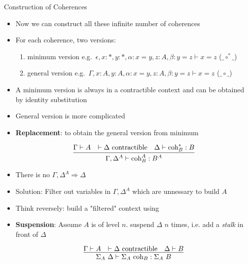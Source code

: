 \documentclass[12pt, mathserif,handout]{beamer}
\begin{document}
\begin{frame}[allowframebreaks,c]{Construction of Coherences}

\begin{itemize}

\item Now we can construct all these infinite number of coherences

\item For each coherence, two versions:
\begin{enumerate}
\item minimum version e.g.\
  $\epsilon,x : *, y : *, \alpha : x = y, z: A,
  \beta : y = z \vdash x = z$ ($\_\circ^{*}\_$)
\item general version e.g.\
  $\Gamma,x : A, y : A, \alpha : x = y, z: A,
  \beta : y = z \vdash x = z$ ($\_\circ\_$)
\end{enumerate}

\item A minimum version is always in a contractible context and can be obtained by identity substitution 

\item General version is more complicated


\item \textbf{Replacement}: to obtain the general version from minimum

\begin{equation*}
\infer{\Gamma, \Delta^{A} \vdash \text{coh}_B^{A} : B^{A}}
{\Gamma \vdash A & \vdash \Delta~ \text{contractible} & \Delta \vdash \text{coh}_B^{*} : B} 
\end{equation*}


\item There is no $\Gamma, \Delta^{A} \Rightarrow \Delta$

\item Solution: Filter out variables in $\Gamma, \Delta^{A}$ which are unnessary to build $A$
\item Think reversely: build a "filtered" context using

\item \textbf{Suspension}: Assume $A$ is of level $n$. suspend $\Delta$ $n$ times, i.e. add a \emph{stalk} in front of $\Delta$

\begin{equation*}
\infer{\Sigma_A ~ \Delta \vdash \Sigma_A ~\text{coh}_B : \Sigma_A ~ B}
{\Gamma \vdash A &  \vdash \Delta ~\text{contractible} & \Delta \vdash B} 
\end{equation*}


\end{itemize}
\end{frame}
\end{document}
